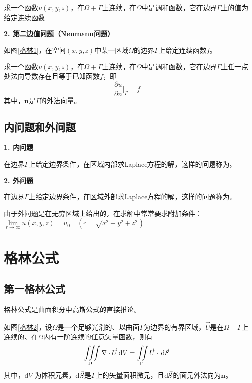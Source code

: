 求一个函数$u(x,y,z)$，在$\Omega+\Gamma$上连续，在$\Omega$中是调和函数，它在边界$\Gamma$上的值为给定连续函数
\vspace*{1em}

\noindent \textbf{2. 第二边值问题（Neumann问题）}

如图\ref{格林1}，在空间$(x,y,z)$中某一区域$\Omega$的边界$\Gamma$上给定连续函数$f$。

求一个函数$u(x,y,z)$，在$\Omega+\Gamma$上连续，在$\Omega$中是调和函数，它在边界$\Gamma$上任一点处法向导数存在且等于已知函数$f$，即
\begin{equation}
	\dfrac{\partial u}{\partial n}\Bigg|_{\Gamma} = f
\end{equation}
其中，$\bm{n}$是$\Gamma$的外法向量。
\vspace*{0.5em}

\subsection{内问题和外问题}

\noindent \textbf{1. 内问题}

在边界$\Gamma$上给定边界条件，在区域内部求Laplace方程的解，这样的问题称为。
\vspace*{1em}

\noindent \textbf{2. 外问题}

在边界$\Gamma$上给定边界条件，在区域外部求Laplace方程的解，这样的问题称为。

由于外问题是在无穷区域上给出的，在求解中常常要求附加条件：$\lim\limits_{r \to \infty} u(x,y,z) = u_0\quad (r = \sqrt{x^2 + y^2 + z^2})$

\section{格林公式}
\subsection{第一格林公式}
格林公式是曲面积分中高斯公式的直接推论。

\theorem[高斯公式]
如图\ref{格林2}，设$\Omega$是一个足够光滑的、以曲面$\Gamma$为边界的有界区域，$\vec{U}$是在$\Omega + \Gamma$上连续的、在$\Omega$内有一阶连续的任意矢量函数，则有
\begin{equation}
	\iiint\limits_{\Omega} \nabla \cdot \vec{U} \, {\rm{d}} V = \iint \limits_{\Gamma} \vec{U} \cdot \, {\rm{d}} \vec{S}
\end{equation}
其中，${\rm{d}} V$为体积元素，${\rm{d}} \vec{S}$是$\Gamma$上的矢量面积微元，且${\rm{d}} \vec{S}$的面元外法向为$\bm{n}$。

